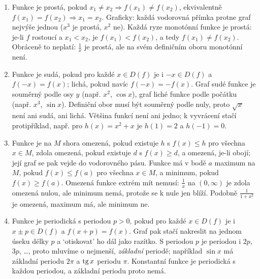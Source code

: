 \begin{enumerate}[label=\textbf{\arabic*.}, leftmargin=*, itemsep=0.8em]
  \item {}
  Funkce je prostá, pokud $x_1\neq x_2\Rightarrow f(x_1)\neq f(x_2)$, ekvivalentně $f(x_1) = f(x_2)\Rightarrow x_1 = x_2$. Graficky: každá vodorovná přímka protne graf nejvýše jednou ($x^3$ je prostá, $x^2$ ne). Každá ryze monotónní funkce je prostá: je-li $f$ rostoucí a $x_1 < x_2$, je $f(x_1) < f(x_2)$, a tedy $f(x_1)\neq f(x_2)$. Obráceně to neplatí: $\frac{1}{x}$ je prostá, ale na svém definičním oboru monotónní není. 

  \item {}
  Funkce je sudá, pokud pro každé $x\in D(f)$ je i $-x\in D(f)$ a $f(-x) = f(x)$; lichá, pokud navíc $f(-x) = -f(x)$. Graf sudé funkce je souměrný podle osy $y$ (např. $x^2$, $\cos x$), graf liché funkce podle počátku (např. $x^3$, $\sin x$). Definiční obor musí být souměrný podle nuly, proto $\sqrt{x}$ není ani sudá, ani lichá. Většina funkcí není ani jedno; k vyvrácení stačí protipříklad, např. pro $h(x) = x^2 + x$ je $h(1) = 2$ a $h(-1) = 0$. 

  \item {}
  Funkce je na $M$ shora omezená, pokud existuje $h$ s $f(x)\leq h$ pro všechna $x\in M$, zdola omezená, pokud existuje $d$ s $f(x)\geq d$, a omezená, je-li obojí; její graf se pak vejde do vodorovného pásu. Funkce má v bodě $a$ maximum na $M$, pokud $f(x)\leq f(a)$ pro všechna $x\in M$, a minimum, pokud $f(x)\geq f(a)$. Omezená funkce extrém mít nemusí: $\frac{1}{x}$ na $(0, \infty)$ je zdola omezená nulou, ale minimum nemá, protože se k nule jen blíží. Podobně $\frac{1}{1 + x^2}$ je omezená, maximum má, ale minimum ne. 

  \item {}
  Funkce je periodická s periodou $p > 0$, pokud pro každé $x\in D(f)$ je i $x\pm p\in D(f)$ a $f(x + p) = f(x)$. Graf pak stačí nakreslit na jednom úseku délky $p$ a `otiskovat' ho dál jako razítko. S periodou $p$ je periodou i $2p$, $3p$, \ldots, proto mluvíme o nejmenší, \emph{základní} periodě; například $\sin x$ má základní periodu $2\pi$ a $\operatorname{tg} x$ periodu $\pi$. Konstantní funkce je periodická s každou periodou, a základní periodu proto nemá. 


\end{enumerate}
